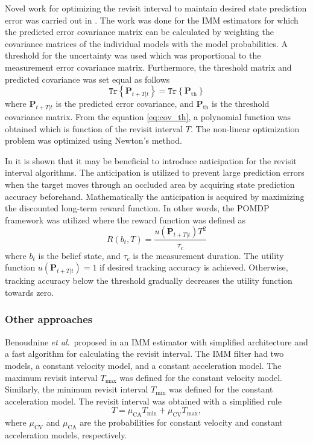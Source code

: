 \documentclass[11pt,a4paper]{article}
\newcommand{\tr}[1]{\texttt{Tr}\left\{ #1 \right\}}
\newcommand{\etal}{\textit{et al}.~}
\renewcommand{\vec}[1]{\mathbf{#1}}
\begin{document}
Novel work for optimizing the revisit interval to maintain desired state prediction error was carried out in \cite{Watson1993}.
The work was done for the IMM estimators for which the predicted error covariance matrix can be calculated by weighting the covariance matrices of the individual models with the model probabilities.
A threshold for the uncertainty was used which was proportional to the measurement error covariance matrix.
Furthermore, the threshold matrix and predicted covariance was set equal as follows  
\begin{equation}\label{eq:cov_th}
    \tr{ \vec{P}_{t+T|t} } = \tr{ \vec{P}_{\text{th}} }
\end{equation}
where $\vec{P}_{t+T|t}$ is the predicted error covariance, and $\vec{P}_{\text{th}}$ is the threshold covariance matrix.
From the equation \eqref{eq:cov_th}, a polynomial function was obtained which is function of the revisit interval $T$.
The non-linear optimization problem was optimized using Newton's method.

In \cite{Charlish2015} it is shown that it may be beneficial to introduce anticipation for the revisit interval algorithms.
The anticipation is utilized to prevent large prediction errors when the target moves through an occluded area by acquiring state prediction accuracy beforehand.
Mathematically the anticipation is acquired by maximizing the discounted long-term reward function.
In other words, the POMDP framework was utilized where the reward function was defined as
\begin{equation}
    R(b_t, T) = \frac{u\left(\vec{P}_{t+T|t} \right) T^2}{\tau_c}
\end{equation}
where $b_t$ is the belief state, and $\tau_c$ is the measurement duration.
The utility function $u\left(\vec{P}_{t+T|t} \right)=1$ if desired tracking accuracy is achieved.
Otherwise, tracking accuracy below the threshold gradually decreases the utility function towards zero.



\subsubsection{Other approaches}

\newcommand{\tmax}{T_\text{max}}
\newcommand{\tmin}{T_\text{min}}
\newcommand{\muca}{\mu_{\text{CA}}}
\newcommand{\mucv}{\mu_{\text{CV}}}

Benoudnine \etal proposed in \cite{Benoudnine2006} an IMM estimator with simplified architecture and a fast algorithm for calculating the revisit interval.
The IMM filter had two models, a constant velocity model, and a constant acceleration model.
The maximum revisit interval $\tmax$ was defined for the constant velocity model.
Similarly, the minimum revisit interval $\tmin$ was defined for the constant acceleration model.
The revisit interval was obtained with a simplified rule
\begin{equation}
    T = \muca \tmin + \mucv \tmax,
\end{equation}
where $\mucv$ and $\muca$ are the probabilities for constant velocity and constant acceleration models, respectively.
\end{document}
